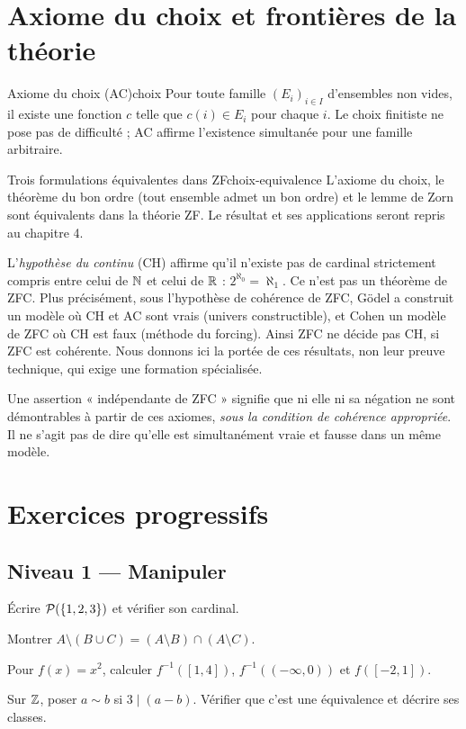 \section{Axiome du choix et frontières de la théorie}
\begin{definition}{Axiome du choix (AC)}{choix}
Pour toute famille $(E_i)_{i\in I}$ d'ensembles non vides, il existe une fonction $c$ telle que $c(i)\in E_i$ pour chaque $i$. Le choix finitiste ne pose pas de difficulté ; AC affirme l'existence simultanée pour une famille arbitraire.
\end{definition}
\begin{proposition}{Trois formulations équivalentes dans ZF}{choix-equivalence}
L'axiome du choix, le théorème du bon ordre (tout ensemble admet un bon ordre) et le lemme de Zorn sont équivalents dans la théorie ZF. Le résultat et ses applications seront repris au chapitre 4.
\end{proposition}
L'\emph{hypothèse du continu} (CH) affirme qu'il n'existe pas de cardinal strictement compris entre celui de $\mathbb N$ et celui de $\mathbb R$ : $2^{\aleph_0}=\aleph_1$. Ce n'est pas un théorème de ZFC. Plus précisément, sous l'hypothèse de cohérence de ZFC, Gödel a construit un modèle où CH et AC sont vrais (univers constructible), et Cohen un modèle de ZFC où CH est faux (méthode du forcing). Ainsi ZFC ne décide pas CH, si ZFC est cohérente. Nous donnons ici la portée de ces résultats, non leur preuve technique, qui exige une formation spécialisée.
\begin{retenir}
Une assertion « indépendante de ZFC » signifie que ni elle ni sa négation ne sont démontrables à partir de ces axiomes, \emph{sous la condition de cohérence appropriée}. Il ne s'agit pas de dire qu'elle est simultanément vraie et fausse dans un même modèle.
\end{retenir}

\section{Exercices progressifs}
\subsection*{Niveau 1 — Manipuler}
\begin{exercice}\label{ex:ens:1}Écrire $\mathcal P(\{1,2,3\})$ et vérifier son cardinal.\end{exercice}
\begin{exercice}\label{ex:ens:2}Montrer $A\setminus(B\cup C)=(A\setminus B)\cap(A\setminus C)$.\end{exercice}
\begin{exercice}\label{ex:ens:3}Pour $f(x)=x^2$, calculer $f^{-1}([1,4])$, $f^{-1}((-\infty,0))$ et $f([-2,1])$.\end{exercice}
\begin{exercice}[Équivalence]\label{ex:ens:4}Sur $\mathbb Z$, poser $a\sim b$ si $3\mid(a-b)$. Vérifier que c'est une équivalence et décrire ses classes.\end{exercice}
